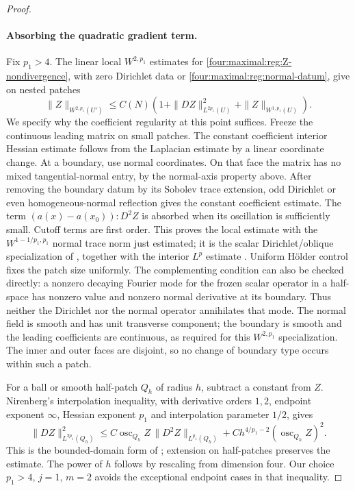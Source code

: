 \begin{proof}
\paragraph{Absorbing the quadratic gradient term.}
Fix $p_1>4$.  The linear local $W^{2,p_1}$ estimates for
\eqref{four:maximal:reg:Z-nondivergence}, with zero Dirichlet data or
\eqref{four:maximal:reg:normal-datum}, give on nested patches
\begin{equation}\label{four:maximal:reg:Z-linear-estimate}
 \|Z\|_{W^{2,p_1}(U')}
 \le C(N)\left(1+\|DZ\|_{L^{2p_1}(U)}^2
                          +\|Z\|_{W^{1,p_1}(U)}\right).
\end{equation}
We specify why the coefficient regularity at this point suffices.
Freeze the continuous leading matrix on small patches.  The constant
coefficient interior Hessian estimate follows from the Laplacian
estimate by a linear coordinate change.  At a boundary, use normal
coordinates.  On that face the matrix has no mixed tangential-normal
entry, by the normal-axis property above.  After removing the
boundary datum by its Sobolev trace extension, odd Dirichlet or even
homogeneous-normal reflection gives the constant coefficient
estimate.  The term
$(a(x)-a(x_0)):D^2Z$ is absorbed when its oscillation is sufficiently
small.  Cutoff terms are first order.  This proves the local
estimate with the $W^{1-1/p_1,p_1}$ normal trace norm just estimated;
it is the scalar Dirichlet/oblique specialization of
\cite[Theorems~15.1--15.3, pp.~702--706, especially
Theorem~15.2, estimate~(15.5)]{AgmonDouglisNirenberg1959}, together with the interior $L^p$ estimate
\cite[Section~9.5]{GilbargTrudinger2001}.  Uniform H\"older control fixes the patch
size uniformly.  The complementing condition can also be checked
directly: a nonzero decaying Fourier mode for the frozen scalar
operator in a half-space has nonzero value and nonzero normal
derivative at its boundary.  Thus neither the Dirichlet nor the
normal operator annihilates that mode.  The normal field is smooth
and has unit transverse component; the boundary is smooth and the
leading coefficients are continuous, as required for this $W^{2,p_1}$
specialization.  The inner and outer faces are disjoint, so no
change of boundary type occurs within such a patch.

For a ball or smooth half-patch $Q_h$ of radius $h$, subtract a
constant from $Z$.  Nirenberg's interpolation inequality, with
derivative orders $1,2$, endpoint exponent $\infty$, Hessian
exponent $p_1$ and interpolation parameter $1/2$, gives
\begin{equation}\label{four:maximal:reg:nirenberg-scaled}
 \|DZ\|_{L^{2p_1}(Q_h)}^2
 \le C\operatorname{osc}_{Q_h}Z\,
                       \|D^2Z\|_{L^{p_1}(Q_h)}
       +Ch^{4/p_1-2}(\operatorname{osc}_{Q_h}Z)^2.
\end{equation}
This is the bounded-domain form of
\cite[Lecture~II, (2.2) and Remark~5,
pp.~125--126]{Nirenberg1959}; extension on half-patches preserves
the estimate.  The power of $h$ follows by rescaling from dimension
four.  Our choice $p_1>4$, $j=1$, $m=2$ avoids the exceptional
endpoint cases in that inequality.


\end{proof}
